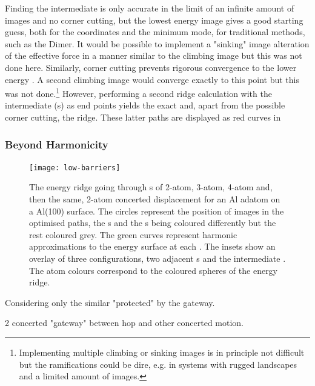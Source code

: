 Finding the intermediate  is only accurate in the limit of an infinite amount of images and no corner cutting, but the lowest energy image gives a good starting guess, both for the coordinates and the minimum mode, for traditional  methods, such as the Dimer.
It would be possible to implement a "sinking" image alteration of the effective force in a manner similar to the climbing image but this was not done here.
Similarly, corner cutting prevents rigorous convergence to the lower energy .
A second climbing image would converge exactly to this point but this was not done.\footnote{Implementing multiple climbing or sinking images is in principle not difficult but the ramifications could be dire, e.g. in systems with rugged landscapes and a limited amount of images.}
However, performing a second ridge calculation with the intermediate (s) as end points yields the exact  and, apart from the possible corner cutting, the ridge.
These latter paths are displayed as red curves in 

\subsubsection{Beyond Harmonicity}
\begin{figure}[hp]
\begin{center}
\texttt{[image: low-barriers]}
\caption{
The energy ridge going through s of 2-atom, 3-atom, 4-atom and, then the same, 2-atom concerted displacement for an Al adatom on a Al(100) surface.
The circles represent the position of images in the optimised paths, the s and the s being coloured differently but the rest coloured grey.
The green curves represent harmonic approximations to the energy surface at each .
The insets show an overlay of three configurations, two adjacent s and the intermediate .
The atom colours correspond to the coloured spheres of the energy ridge.
}
\label{fig:low-barriers}
\end{center}
\end{figure}
Considering only the similar "protected" by the gateway.


\bit
\item 2 concerted "gateway" between hop and other concerted motion.
\eit

\placeholder


